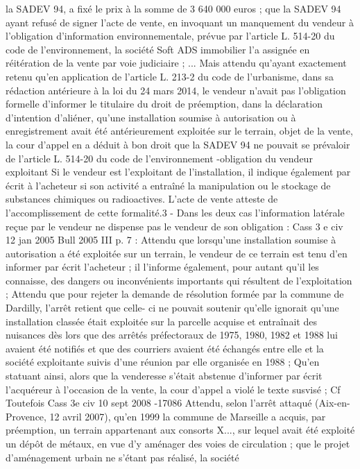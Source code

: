 \documentclass[11pt,a4paper]{report}
\begin{document}
	la SADEV 94, a fixé le prix à la somme de 3 640 000 euros ; que la SADEV 94 ayant refusé de signer l'acte de
	vente, en invoquant un manquement du vendeur à l'obligation d'information environnementale, prévue par
	l'article L. 514-20 du code de l'environnement, la société Soft ADS immobilier l'a assignée en réitération de la
	vente par voie judiciaire ; ...
	Mais attendu qu'ayant exactement retenu qu'en application de l'article L. 213-2 du code de l'urbanisme, dans sa
	rédaction antérieure à la loi du 24 mars 2014, le vendeur n'avait pas l'obligation formelle d'informer le titulaire
	du droit de préemption, dans la déclaration d'intention d'aliéner, qu'une installation soumise à autorisation ou à
	enregistrement avait été antérieurement exploitée sur le terrain, objet de la vente, la cour d'appel en a déduit à
	bon droit que la SADEV 94 ne pouvait se prévaloir de l'article L. 514-20 du code de l'environnement
	-obligation du vendeur exploitant Si le vendeur est l'exploitant de l'installation, il indique également par écrit
	à l'acheteur si son activité a entraîné la manipulation ou le stockage de substances chimiques ou radioactives.
	L'acte de vente atteste de l'accomplissement de cette formalité.3
	- Dans les deux cas l’information latérale reçue par le vendeur ne dispense pas le vendeur de son
	obligation : Cass 3 e civ 12 jan 2005 Bull 2005 III  p. 7 : Attendu que lorsqu'une installation soumise à
	autorisation a été exploitée sur un terrain, le vendeur de ce terrain est tenu d'en informer par écrit l'acheteur ; il
	l'informe également, pour autant qu'il les connaisse, des dangers ou inconvénients importants qui résultent de
	l'exploitation ;
	Attendu que pour rejeter la demande de résolution formée par la commune de Dardilly, l'arrêt retient que celle-
	ci ne pouvait soutenir qu'elle ignorait qu'une installation classée était exploitée sur la parcelle acquise et
	entraînait des nuisances dès lors que des arrêtés préfectoraux de 1975, 1980, 1982 et 1988 lui avaient été
	notifiés et que des courriers avaient été échangés entre elle et la société exploitante suivis d'une réunion par elle
	organisée en 1988 ;
	Qu'en statuant ainsi, alors que la venderesse s'était abstenue d'informer par écrit l'acquéreur à l'occasion de la
	vente, la cour d'appel a violé le texte susvisé ;
	Cf Toutefois Cass 3e civ 10 sept 2008 -17086
	Attendu, selon l'arrêt attaqué (Aix-en-Provence, 12 avril 2007), qu'en 1999 la commune de Marseille a acquis,
	par préemption, un terrain appartenant aux consorts X..., sur lequel avait été exploité un dépôt de métaux, en
	vue d'y aménager des voies de circulation ; que le projet d'aménagement urbain ne s'étant pas réalisé, la société
\end{document}
